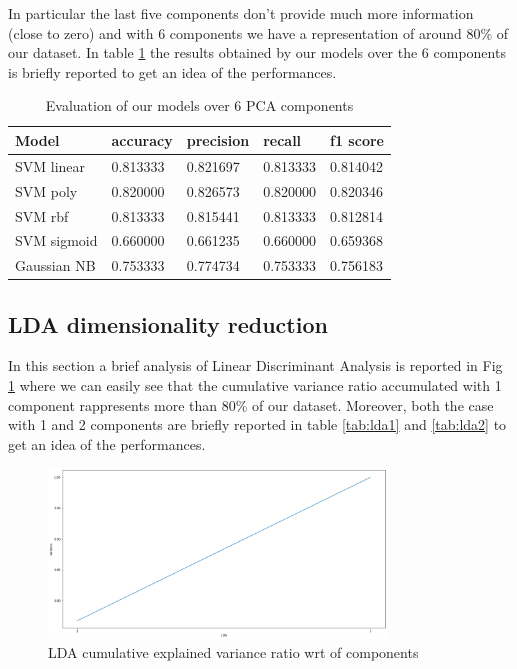 \documentclass[a4paper,12pt]{article}
\begin{document}
\noindent In particular the last five components don't provide much more information (close to zero) and with 6 components we have a representation of around 80\% of our dataset. In table \ref{tab:pca} the results obtained by our models over the 6 components is briefly reported to get an idea of the performances.

\begin{table}[H]
  \begin{tabular}{ |p{6cm}||p{2cm}|p{2cm}|p{2cm}|p{2cm}| }
    \hline
    Model& accuracy & precision  &  recall & f1 score \\
    \hline
    SVM linear           &0.813333&   0.821697&  0.813333&  0.814042\\
    SVM poly             &0.820000&   0.826573&  0.820000&  0.820346\\
    SVM rbf              &0.813333&   0.815441&  0.813333&  0.812814\\
    SVM sigmoid          &0.660000&   0.661235&  0.660000&  0.659368\\
    Gaussian NB          &0.753333&   0.774734&  0.753333&  0.756183\\
    \hline
  \end{tabular}
  \caption{Evaluation of our models over 6 PCA components}
  \label{tab:pca}
  \end{table}

\newpage
\subsection{LDA dimensionality reduction}

In this section a brief analysis of Linear Discriminant Analysis is reported in Fig \ref{fig:lda} where we can easily see that the cumulative variance ratio accumulated with 1 component rappresents more than 80\% of our dataset.
Moreover, both the case with 1 and 2 components are briefly reported in table \ref{tab:lda1} and \ref{tab:lda2} to get an idea of the performances. 

\begin{figure}[H]
  \begin{center}
  \includegraphics[width=0.8\textwidth]{images/lda.png}
  \end{center}
  \caption{LDA cumulative explained variance ratio wrt of components}
  \label{fig:lda}
\end{figure}
\end{document}
